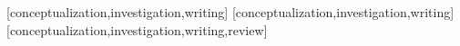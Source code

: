 \documentclass[spanish]{textolivre}
\begin{document}
\printbibliography\label{sec-bib}


\begin{contributors}
[conceptualization,investigation,writing]
[conceptualization,investigation,writing]
[conceptualization,investigation,writing,review]
\end{contributors}
\end{document}
